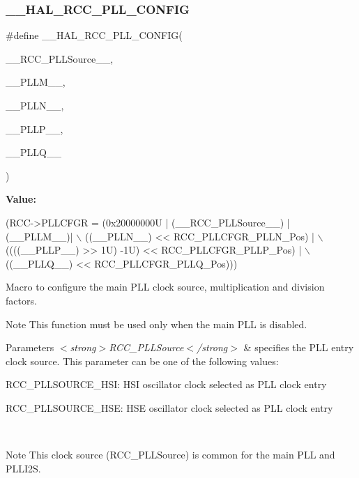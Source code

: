 \subsubsection{\texorpdfstring{\+\_\+\+\_\+\+H\+A\+L\+\_\+\+R\+C\+C\+\_\+\+P\+L\+L\+\_\+\+C\+O\+N\+F\+IG}{\_\_HAL\_RCC\_PLL\_CONFIG}}
{\footnotesize\ttfamily \#define \+\_\+\+\_\+\+H\+A\+L\+\_\+\+R\+C\+C\+\_\+\+P\+L\+L\+\_\+\+C\+O\+N\+F\+IG(\begin{DoxyParamCaption}\item[{}]{\+\_\+\+\_\+\+R\+C\+C\+\_\+\+P\+L\+L\+Source\+\_\+\+\_\+,  }\item[{}]{\+\_\+\+\_\+\+P\+L\+L\+M\+\_\+\+\_\+,  }\item[{}]{\+\_\+\+\_\+\+P\+L\+L\+N\+\_\+\+\_\+,  }\item[{}]{\+\_\+\+\_\+\+P\+L\+L\+P\+\_\+\+\_\+,  }\item[{}]{\+\_\+\+\_\+\+P\+L\+L\+Q\+\_\+\+\_\+ }\end{DoxyParamCaption})}

{\bfseries Value\+:}
\begin{DoxyCode}
(RCC->PLLCFGR = (0x20000000U | (\_\_RCC\_PLLSource\_\_) | (\_\_PLLM\_\_)| \(\backslash\)
                            ((\_\_PLLN\_\_) << RCC\_PLLCFGR\_PLLN\_Pos)                | \(\backslash\)
                            ((((\_\_PLLP\_\_) >> 1U) -1U) << RCC\_PLLCFGR\_PLLP\_Pos)    | \(\backslash\)
                            ((\_\_PLLQ\_\_) << RCC\_PLLCFGR\_PLLQ\_Pos)))
\end{DoxyCode}


Macro to configure the main P\+LL clock source, multiplication and division factors. 

\begin{DoxyNote}{Note}
This function must be used only when the main P\+LL is disabled. 
\end{DoxyNote}

\begin{DoxyParams}{Parameters}
{\em $<$strong$>$\+R\+C\+C\+\_\+\+P\+L\+L\+Source$<$/strong$>$} & specifies the P\+LL entry clock source. This parameter can be one of the following values\+: \begin{DoxyItemize}
\item R\+C\+C\+\_\+\+P\+L\+L\+S\+O\+U\+R\+C\+E\+\_\+\+H\+SI\+: H\+SI oscillator clock selected as P\+LL clock entry \item R\+C\+C\+\_\+\+P\+L\+L\+S\+O\+U\+R\+C\+E\+\_\+\+H\+SE\+: H\+SE oscillator clock selected as P\+LL clock entry \end{DoxyItemize}
\\
\hline
\end{DoxyParams}
\begin{DoxyNote}{Note}
This clock source (R\+C\+C\+\_\+\+P\+L\+L\+Source) is common for the main P\+LL and P\+L\+L\+I2S. 
\end{DoxyNote}

